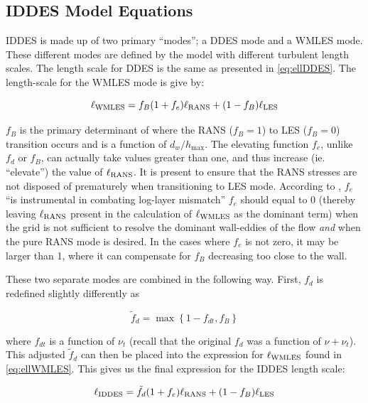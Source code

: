 \documentclass{ucb}
\newcommand{\WMLES}{\textup{WMLES}}
\newcommand{\RANS}{\textup{RANS}}
\newcommand{\LES}{\textup{LES}}
\newcommand{\IDDES}{\textup{IDDES}}
\begin{document}

\subsection{IDDES Model Equations}
IDDES is made up of two primary ``modes''; a DDES mode and a WMLES mode. These different modes are defined by the model with different turbulent length scales. The length scale for DDES is the same as presented in \cref{eq:ellDDES}.
The length-scale for the WMLES mode is give by:

\begin{equation}\label{eq:ellWMLES}
    \ell_\WMLES = f_B (1+f_e) \ell_\RANS + (1-f_B)\ell_\LES
\end{equation}

\(f_B \) is the primary determinant of where the RANS (\(f_B =1\)) to LES (\(f_B = 0\)) transition occurs and is a function of \(d_w / h_{\max} \).
The elevating function \(f_e \), unlike \(f_d \) or \(f_B \), can actually take values greater than one, and thus increase (ie. ``elevate'') the value of \(\ell_\RANS \). It is present to ensure that the RANS stresses are not disposed of prematurely when transitioning to LES mode. According to \citeauthor{shurHybridRANSLESApproach2008}, \(f_e \) ``is instrumental in combating log-layer mismatch'' \cite{shurHybridRANSLESApproach2008} \(f_e \) should equal to 0 (thereby leaving \(\ell_\RANS \) present in the calculation of \(\ell_\WMLES \) as the dominant term) when the grid is not sufficient to resolve the dominant wall-eddies of the flow \textit{and} when the pure RANS mode is desired. In the cases where \(f_e \) is not zero, it may be larger than 1, where it can compensate for \(f_B \) decreasing too close to the wall.

These two separate modes are combined in the following way. First, \(f_d \) is redefined slightly differently as

\begin{equation}
    \tilde{f}_d = \max \left\{ 1- f_{dt}, f_B \right\}
\end{equation}

where \(f_{dt} \) is a function of \(\nu_t \) (recall that the original \(f_d \) was a function of \(\nu + \nu_t \)). This adjusted \(\tilde{f}_d \) can then be placed into the expression for \(\ell_\WMLES \) found in \cref{eq:ellWMLES}. This gives us the final expression for the IDDES length scale:

\begin{equation}\label{eq:ellIDDES}
    \ell_\IDDES = \tilde{f}_d (1 + f_e) \ell_\RANS + (1 - f_B) \ell_\LES
\end{equation}
\end{document}
